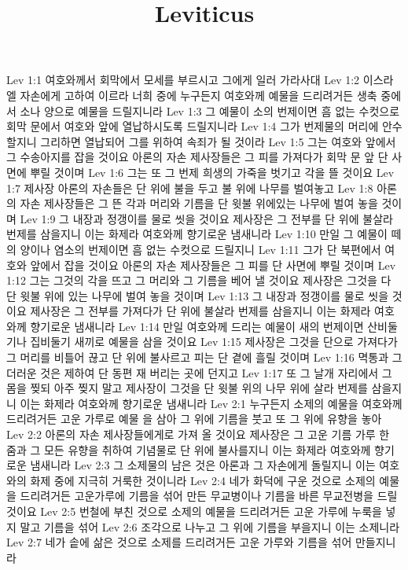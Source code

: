 

\title{Leviticus}

Lev 1:1  여호와께서 회막에서 모세를 부르시고 그에게 일러 가라사대
Lev 1:2  이스라엘 자손에게 고하여 이르라 너희 중에 누구든지 여호와께 예물을 드리려거든 생축 중에서 소나 양으로 예물을 드릴지니라
Lev 1:3  그 예물이 소의 번제이면 흠 없는 수컷으로 회막 문에서 여호와 앞에 열납하시도록 드릴지니라
Lev 1:4  그가 번제물의 머리에 안수할지니 그리하면 열납되어 그를 위하여 속죄가 될 것이라
Lev 1:5  그는 여호와 앞에서 그 수송아지를 잡을 것이요 아론의 자손 제사장들은 그 피를 가져다가 회막 문 앞 단 사면에 뿌릴 것이며
Lev 1:6  그는 또 그 번제 희생의 가죽을 벗기고 각을 뜰 것이요
Lev 1:7  제사장 아론의 자손들은 단 위에 불을 두고 불 위에 나무를 벌여놓고
Lev 1:8  아론의 자손 제사장들은 그 뜬 각과 머리와 기름을 단 윗불 위에있는 나무에 벌여 놓을 것이며
Lev 1:9  그 내장과 정갱이를 물로 씻을 것이요 제사장은 그 전부를 단 위에 불살라 번제를 삼을지니 이는 화제라 여호와께 향기로운 냄새니라
Lev 1:10  만일 그 예물이 떼의 양이나 염소의 번제이면 흠 없는 수컷으로 드릴지니
Lev 1:11  그가 단 북편에서 여호와 앞에서 잡을 것이요 아론의 자손 제사장들은 그 피를 단 사면에 뿌릴 것이며
Lev 1:12  그는 그것의 각을 뜨고 그 머리와 그 기름을 베어 낼 것이요 제사장은 그것을 다 단 윗불 위에 있는 나무에 벌여 놓을 것이며
Lev 1:13  그 내장과 정갱이를 물로 씻을 것이요 제사장은 그 전부를 가져다가 단 위에 불살라 번제를 삼을지니 이는 화제라 여호와께 향기로운 냄새니라
Lev 1:14  만일 여호와께 드리는 예물이 새의 번제이면 산비둘기나 집비둘기 새끼로 예물을 삼을 것이요
Lev 1:15  제사장은 그것을 단으로 가져다가 그 머리를 비틀어 끊고 단 위에 불사르고 피는 단 곁에 흘릴 것이며
Lev 1:16  멱통과 그 더러운 것은 제하여 단 동편 재 버리는 곳에 던지고
Lev 1:17  또 그 날개 자리에서 그 몸을 찢되 아주 찢지 말고 제사장이 그것을 단 윗불 위의 나무 위에 살라 번제를 삼을지니 이는 화제라 여호와께 향기로운 냄새니라
Lev 2:1  누구든지 소제의 예물을 여호와께 드리려거든 고운 가루로 예물 을 삼아 그 위에 기름을 붓고 또 그 위에 유향을 놓아
Lev 2:2  아론의 자손 제사장들에게로 가져 올 것이요 제사장은 그 고운 기름 가루 한 줌과 그 모든 유향을 취하여 기념물로 단 위에 불사를지니 이는 화제라 여호와께 향기로운 냄새니라
Lev 2:3  그 소제물의 남은 것은 아론과 그 자손에게 돌릴지니 이는 여호와의 화제 중에 지극히 거룩한 것이니라
Lev 2:4  네가 화덕에 구운 것으로 소제의 예물을 드리려거든 고운가루에 기름을 섞어 만든 무교병이나 기름을 바른 무교전병을 드릴것이요
Lev 2:5  번철에 부친 것으로 소제의 예물을 드리려거든 고운 가루에 누룩을 넣지 말고 기름을 섞어
Lev 2:6  조각으로 나누고 그 위에 기름을 부을지니 이는 소제니라
Lev 2:7  네가 솥에 삶은 것으로 소제를 드리려거든 고운 가루와 기름을 섞어 만들지니라
